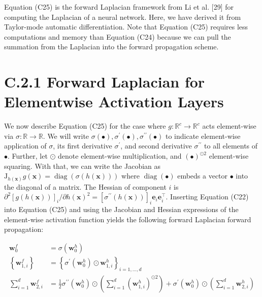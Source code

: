 \documentclass[10pt]{article}
\begin{document}
Equation (C25) is the forward Laplacian framework from Li et al. [29] for computing the Laplacian of a neural network. Here, we have derived it from Taylor-mode automatic differentiation. Note that Equation (C25) requires less computations and memory than Equation (C24) because we can pull the summation from the Laplacian into the forward propagation scheme.

\section*{C.2.1 Forward Laplacian for Elementwise Activation Layers}
We now describe Equation (C25) for the case where $g: \mathbb{R}^{c} \rightarrow \mathbb{R}^{c}$ acts element-wise via $\sigma: \mathbb{R} \rightarrow \mathbb{R}$. We will write $\sigma(\bullet), \sigma^{\prime}(\bullet), \sigma^{\prime \prime}(\bullet)$ to indicate element-wise application of $\sigma$, its first derivative $\sigma^{\prime}$, and second derivative $\sigma^{\prime \prime}$ to all elements of $\bullet$. Further, let $\odot$ denote element-wise multiplication, and $(\bullet)^{\odot 2}$ element-wise squaring. With that, we can write the Jacobian as $\mathrm{J}_{h(\boldsymbol{x})} g(\boldsymbol{x})=\operatorname{diag}(\sigma(h(\boldsymbol{x})))$ where $\operatorname{diag}(\bullet)$ embeds a vector $\bullet$ into the diagonal of a matrix. The Hessian of component $i$ is $\partial^{2}[g(h(\boldsymbol{x}))]_{i} / \partial h(\boldsymbol{x})^{2}=\left[\sigma^{\prime \prime}(h(\boldsymbol{x}))\right]_{i} \boldsymbol{e}_{i} \boldsymbol{e}_{i}^{\top}$. Inserting Equation (C22) into Equation (C25) and using the Jacobian and Hessian expressions of the element-wise activation function yields the following forward Laplacian forward propagation:


\begin{align*}
\boldsymbol{w}_{0}^{f} & =\sigma\left(\boldsymbol{w}_{0}^{h}\right)  \tag{C26a}\\
\left\{\boldsymbol{w}_{1, i}^{f}\right\} & =\left\{\sigma^{\prime}\left(\boldsymbol{w}_{0}^{h}\right) \odot \boldsymbol{w}_{1, i}^{h}\right\}_{i=1, \ldots, d}  \tag{C26b}\\
\sum_{i=1}^{d} \boldsymbol{w}_{2, i}^{f} & =\frac{1}{2} \sigma^{\prime \prime}\left(\boldsymbol{w}_{0}^{h}\right) \odot\left(\sum_{i=1}^{d}\left(\boldsymbol{w}_{1, i}^{h}\right)^{\odot 2}\right)+\sigma^{\prime}\left(\boldsymbol{w}_{0}^{h}\right) \odot\left(\sum_{i=1}^{d} \boldsymbol{w}_{2, i}^{h}\right) \tag{C26c}
\end{align*}
\end{document}
